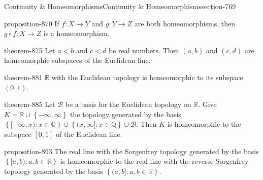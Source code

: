 \documentclass[oneside,10pt,]{article}
\newcommand{\mb}{\mathbb}
\newcommand{\mc}{\mathcal}
\newcommand{\setBuilder}[2]{\left\{#1:#2\right\}}
\newcommand{\setList}[1]{\left\{#1\right\}}
\newcommand{\lt}{<}
\begin{document}
\begin{sectionptx}{Continuity \& Homeomorphisms}{}{Continuity \& Homeomorphisms}{}{}{section-769}
\begin{proposition}{}{}{proposition-870}
\hypertarget{p-871}{}%
If \(f:X\to Y\) and \(g:Y\to Z\) are both homeomorphisms, then \(g\circ f:X\to Z\) is a homeomorphism.%
\end{proposition}
\begin{theorem}{}{}{theorem-875}%
\hypertarget{p-876}{}%
Let \(a\lt b\) and \(c\lt d\) be real numbers. Then \((a,b)\) and \((c,d)\) are homeomorphic subspaces of the Euclidean line.%
\end{theorem}
\begin{theorem}{}{}{theorem-881}%
\hypertarget{p-882}{}%
\(\mb R\) with the Euclidean topology is homeomorphic to its subspace \((0,1)\).%
\end{theorem}
\begin{theorem}{}{}{theorem-885}%
\hypertarget{p-886}{}%
Let \(\mc B\) be a basis for the Euclidean topology on \(\mb R\). Give \(K=\mb R\cup\setList{-\infty,\infty}\) the topology generated by the basis \(\setBuilder{[-\infty,x)}{x\in\mb Q}\cup
\setBuilder{(x,\infty]}{x\in\mb Q}\cup\mc B\). Then \(K\) is homeomorphic to the subspace \([0,1]\) of the Euclidean line.%
\end{theorem}
\begin{proposition}{}{}{proposition-893}%
\hypertarget{p-894}{}%
The real line with the Sorgenfrey topology generated by the basis \(\setBuilder{[a,b)}{a,b\in\mb R}\) is homeomorphic to the real line with the reverse Sorgenfrey topology generated by the basis \(\setBuilder{(a,b]}{a,b\in\mb R}\).%
\end{proposition}
\end{sectionptx}
%
%
\typeout{************************************************}
\typeout{************************************************}
%
\end{document}
